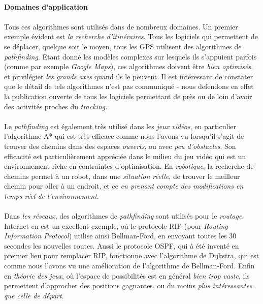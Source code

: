 \paragraph{Domaines d'application}

\paragraph{} Tous ces algorithmes sont utilisés dans de nombreux domaines. Un premier exemple évident
est \emph{la recherche d'itinéraires}. Tous les logiciels qui permettent de se déplacer, quelque soit le moyen,
tous les GPS utilisent des algorithmes de \emph{pathfinding}. Etant donné les modèles complexes sur lesquels
ils s'appuient parfois (comme par exemple \emph{Google Maps}), ces algorithmes doivent être \emph{bien optimisés},
et privilégier \emph{les grands axes} quand ils le peuvent. Il est intéressant de constater que le détail de tels
algorithmes n'est pas communiqué - nous defendons en effet la publication ouverte de tous les logiciels permettant de près
ou de loin d'avoir des activités proches du \emph{tracking}.

\paragraph{} Le \emph{pathfinding} est également très utilisé dans les \emph{jeux vidéos}, en particulier l'algorithme A*
qui est très efficace comme nous l'avons vu lorsqu'il s'agit de trouver des chemins dans des espaces \emph{ouverts}, ou
avec \emph{peu d'obstacles}. Son efficacité est particulièrement appréciée dans le milieu du jeu vidéo qui est 
un environnement riche en contraintes d'optimisation. En \emph{robotique}, la recherche de chemins permet à un robot,
dans une \emph{situation réelle}, de trouver le meilleur chemin pour aller à un endroit, et ce \emph{en prenant compte des
modifications en temps réel de l'environnement}.

\paragraph{} Dans \emph{les réseaux}, des algorithmes de \emph{pathfinding} sont utilisés pour le \emph{routage}. Internet
en est un excellent exemple, où le protocole RIP (pour \emph{Routing Information Protocol}) utilise ainsi Bellman-Ford, en
envoyant toutes les 30 secondes les nouvelles routes. \cite{AI1} Aussi le protocole OSPF, qui à été inventé en premier lieu
pour remplacer RIP, fonctionne avec l'algorithme de Dijkstra, qui est comme nous l'avons vu une amélioration de l'algorithme
de Bellman-Ford. Enfin en \emph{théorie des jeux}, où l'espace de possibilités est en général \emph{bien trop vaste}, ils
permettent d'approcher des positions gagnantes, ou du moins \emph{plus intéressantes que celle de départ}.

